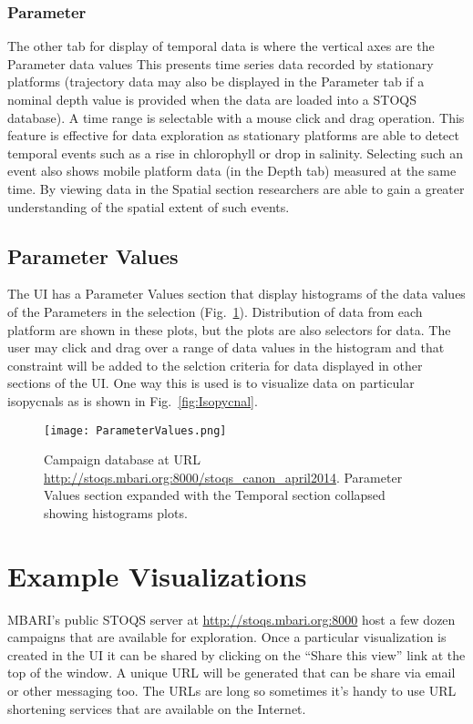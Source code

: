 \documentclass[conference]{IEEEtran}
\begin{document}
\subsubsection{Parameter}
The other tab for display of temporal data is where the vertical axes are the Parameter data values
This presents time series data recorded by stationary platforms
(trajectory data may also be displayed in the Parameter tab if a nominal
depth value is provided when the data are loaded into a STOQS database).
A time range is selectable with a mouse click and drag operation. This 
feature is effective for data exploration as stationary platforms are able 
to detect temporal events such as a rise in chlorophyll or drop in salinity. 
Selecting such an event also shows mobile platform data (in the Depth tab) 
measured at the same time. By viewing data in the Spatial section 
researchers are able to gain a greater understanding of the spatial 
extent of such events.

\subsection{Parameter Values}

The UI has a Parameter Values section that display histograms of the data values
of the Parameters in the selection (Fig.~\ref{fig:ParameterValues}). 
Distribution of data from each platform are shown in these plots, 
but the plots are also selectors for data. The user may click and drag over
a range of data values in the histogram and that constraint will be added to the selction criteria
for data displayed in other sections of the UI. One way this is used is to visualize
data on particular isopycnals as is shown in Fig.~\ref{fig:Isopycnal}.

\begin{figure}[htbp]
\centering
\texttt{[image: ParameterValues.png]}
\caption{Campaign database at URL \url{http://stoqs.mbari.org:8000/stoqs_canon_april2014}. 
Parameter Values section expanded with the Temporal section collapsed 
showing histograms plots.}
\label{fig:ParameterValues}
\end{figure}


\section{Example Visualizations}

MBARI's public STOQS server at \url{http://stoqs.mbari.org:8000} host a few dozen 
campaigns that are available for exploration. Once a particular visualization is
created in the UI it can be shared by clicking on the ``Share this view'' link
at the top of the window. A unique URL will be generated that can be share via 
email or other messaging too. The URLs are long so sometimes it's handy to use
URL shortening services that are available on the Internet.
\end{document}
